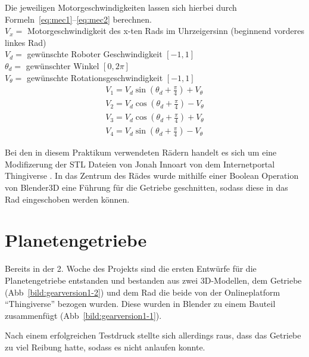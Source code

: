 Die jeweiligen Motorgeschwindigkeiten lassen sich hierbei durch Formeln~\ref{eq:mec1}--\ref{eq:mec2} berechnen.\\

$V_x =$ Motorgeschwindigkeit des x-ten Rads im Uhrzeigersinn (beginnend vorderes linkes Rad)\\
$V_d =$ gewünschte Roboter Geschwindigkeit $[-1, 1]$\\
$\theta_d =$ gewünschter Winkel $[0, 2\pi]$\\
$V_\theta =$ gewünschte Rotationsgeschwindigkeit $[-1, 1]$\\


\begin{align}
	V_1 = V_d\sin{(\theta_d+\frac{\pi}{4})} + V_\theta \label{eq:mec1}\\
	V_2 = V_d\cos{(\theta_d+\frac{\pi}{4})} - V_\theta\\
	V_3 = V_d\cos{(\theta_d+\frac{\pi}{4})} + V_\theta\\
	V_4 = V_d\sin{(\theta_d+\frac{\pi}{4})} - V_\theta \label{eq:mec2}
\end{align} 
\bigskip

Bei den in diesem Praktikum verwendeten Rädern handelt es sich um eine Modifizerung der STL Dateien von Jonah Innoart von dem Internetportal Thingiverse \cite{link:mecanum44}. 
In das Zentrum des Rädes wurde mithilfe einer Boolean Operation von Blender3D eine Führung für die Getriebe geschnitten, sodass diese in das Rad eingeschoben werden können.

\section{Planetengetriebe}

Bereits in der 2. Woche des Projekts sind die ersten Entwürfe für die Planetengetriebe entstanden und bestanden aus zwei 3D-Modellen, dem Getriebe (Abb~\ref{bild:gearversion1-2}) und dem Rad die beide von der Onlineplatform ``Thingiverse'' bezogen wurden.
Diese wurden in Blender zu einem Bauteil zusammenfügt (Abb~\ref{bild:gearversion1-1}). 

Nach einem erfolgreichen Testdruck stellte sich allerdings raus, dass das Getriebe zu viel Reibung hatte, sodass es nicht anlaufen konnte.

